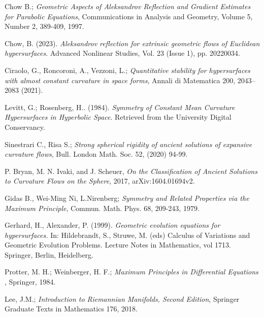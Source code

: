 \documentclass[a4paper, 12pt]{book}
\begin{document}
{}
\begin{thebibliography}{11} 
	 Chow B.; {\em Geometric Aspects of Aleksandrov Reflection and Gradient Estimates for Parabolic Equations}, Communications in Analysis and Geometry, Volume 5, Number 2, 389-409, 1997.
	
	 Chow, B. (2023). {\em Aleksandrov reflection for extrinsic geometric flows of Euclidean hypersurfaces}. Advanced Nonlinear Studies, Vol. 23 (Issue 1), pp. 20220034.
	
	 Ciraolo, G., Roncoroni, A., Vezzoni, L.;  {\em Quantitative stability for hypersurfaces with almost constant curvature in space forms}, Annali di Matematica 200, 2043–2083 (2021).
	
	Levitt, G.; Rosenberg, H.. (1984). {\em Symmetry of Constant Mean Curvature Hypersurfaces in Hyperbolic Space}. Retrieved from the University Digital Conservancy.%
	
	 Sinestrari C., Risa S.; {\em Strong spherical rigidity of ancient solutions of expansive curvature flows},  Bull. London Math. Soc. 52, (2020) 94-99. 
	
	P. Bryan, M. N. Ivaki, and J. Scheuer, {\em On the Classification of Ancient Solutions to Curvature Flows on the Sphere}, 2017,
	arXiv:1604.01694v2.
	
	 Gidas B., Wei-Ming Ni, L.Nirenberg; {\em Symmetry and Related Properties via the Maximum Principle},  Commun. Math. Phys. 68, 209-243, 1979. 
	
	 Gerhard, H., Alexander, P. (1999). {\em Geometric evolution equations for hypersurfaces.} In: Hildebrandt, S., Struwe, M. (eds) Calculus of Variations and Geometric Evolution Problems. Lecture Notes in Mathematics, vol 1713. Springer, Berlin, Heidelberg.
	
	
	  Protter, M. H.;  Weinberger, H. F.; {\em Maximum Principles in Differential Equations },  Springer, 1984. 
	
	
	 Lee, J.M.; {\em Introduction to Riemannian Manifolds, Second Edition},  Springer Graduate Texts in Mathematics 176, 2018. 
	

\end{thebibliography}
\end{document}

